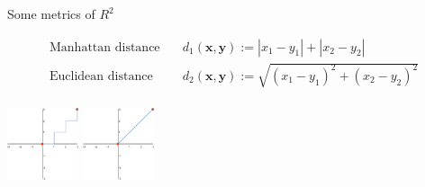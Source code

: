 \documentclass{beamer}
\begin{document}
\begin{frame}{Some metrics of $R^2$}
    \begin{block}{}
        \begin{align*}
            \text{Manhattan distance} \quad & d_1(\textbf{x},\textbf{y}) :=
            |x_1 - y_1| + |x_2 - y_2| \\
            \text{Euclidean distance} \quad & d_2(\textbf{x},\textbf{y}) :=
            \sqrt{{(x_1 - y_1)}^2 + {(x_2 - y_2)}^2} \\
        \end{align*}
    \end{block}
    \includegraphics[height=80]{graph2.pdf} \quad
    \includegraphics[height=80]{graph1.pdf}

\end{frame}
\end{document}
